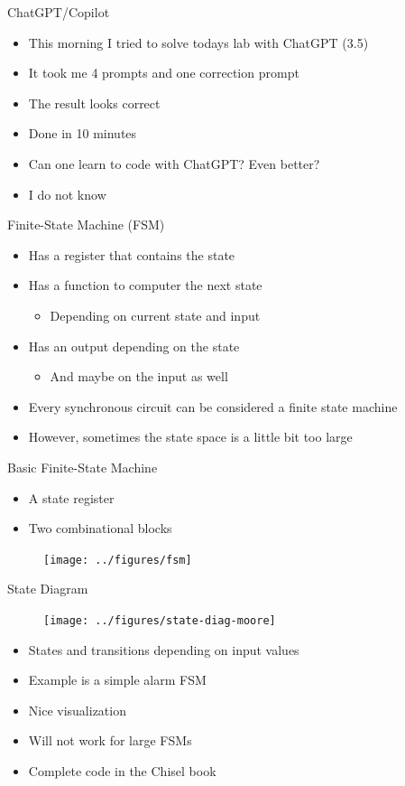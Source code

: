 \begin{frame}[fragile]{ChatGPT/Copilot}
\begin{itemize}
\item This morning I tried to solve todays lab with ChatGPT (3.5)
\item It took me 4 prompts and one correction prompt
\item The result looks correct
\item Done in 10 minutes
\item Can one learn to code with ChatGPT? Even better?
\item I do not know
\end{itemize}
\end{frame}

\begin{frame}[fragile]{Finite-State Machine (FSM)}
\begin{itemize}
\item Has a register that contains the state
\item Has a function to computer the next state
\begin{itemize}
\item Depending on current state and input
\end{itemize}
\item Has an output depending on the state
\begin{itemize}
\item And maybe on the input as well
\end{itemize}
\item Every synchronous circuit can be considered a finite state machine
\item However, sometimes the state space is a little bit too large
\end{itemize}
\end{frame}

\begin{frame}[fragile]{Basic Finite-State Machine}
\begin{itemize}
\item A state register
\item Two combinational blocks
\end{itemize}
\begin{figure}
  \texttt{[image: ../figures/fsm]}
\end{figure}
\end{frame}

\begin{frame}[fragile]{State Diagram}
\begin{figure}
  \texttt{[image: ../figures/state-diag-moore]}
\end{figure}
\begin{itemize}
\item States and transitions depending on input values
\item Example is a simple alarm FSM
\item Nice visualization
\item Will not work for large FSMs
\item Complete code in the Chisel book
\end{itemize}
\end{frame}


